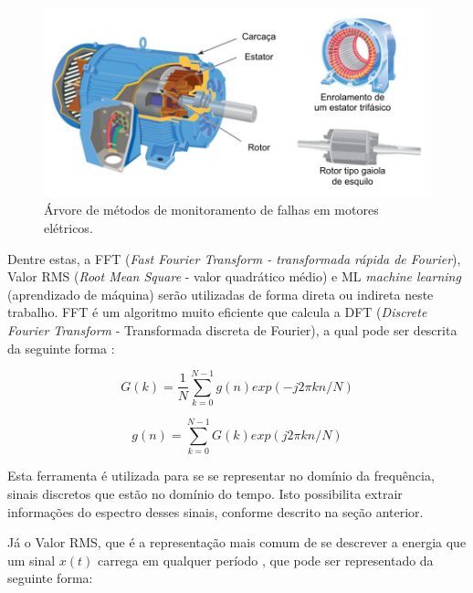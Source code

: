 \begin{figure}[H]
    \caption{Árvore de métodos de monitoramento de falhas em motores elétricos.}
    \begin{center}
        \includegraphics[scale=0.9, page=8]{referencial/img/imagens_referencial.pdf}
    \end{center}
    \label{fig:monitoring_methods_rilski_p78}
\end{figure}

Dentre estas, a FFT (\textit{Fast Fourier Transform - transformada rápida de Fourier}), Valor RMS (\textit{Root Mean Square} - valor quadrático 
médio) e ML \textit{machine learning} (aprendizado de máquina) serão utilizadas de forma direta ou indireta neste trabalho.
FFT é um algoritmo muito eficiente que calcula a DFT (\textit{Discrete Fourier Transform} - Transformada  discreta de Fourier), a qual pode ser
descrita da seguinte forma \cite{Wu2013}:

\begin{equation}\label{eq:dft}
    G(k)=\frac{1}{N}\sum_{k=0}^{N-1} g(n)exp(-j2\pi kn/N)
\end{equation}

\begin{equation}\label{eq:dft2}
    g(n)=\sum_{k=0}^{N-1} G(k)exp(j2\pi kn/N)
\end{equation}

Esta ferramenta é utilizada para se se representar no domínio da frequência, sinais discretos que estão no domínio do tempo. Isto 
possibilita extrair informações do espectro desses sinais, conforme descrito na seção anterior. 

Já o Valor RMS, que é a representação mais comum de se descrever a energia que um sinal  $x(t)$ carrega em qualquer período \cite{Cryer2010}, 
que pode ser representado da seguinte forma:

